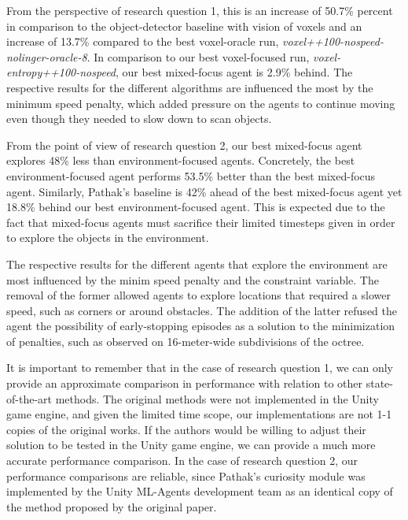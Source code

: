        From the perspective of research question 1, this is an increase of 50.7\% percent in comparison to the object-detector baseline with vision of voxels and an increase of 13.7\% compared to the best voxel-oracle run, \textit{voxel++100-nospeed-nolinger-oracle-8}.
        In comparison to our best voxel-focused run, \textit{voxel-entropy++100-nospeed}, our best mixed-focus agent is 2.9\% behind.
        The respective results for the different algorithms are influenced the most by the minimum speed penalty, which added pressure on the agents to continue moving even though they needed to slow down to scan objects.

        From the point of view of research question 2, our best mixed-focus agent explores 48\% less than environment-focused agents. Concretely, the best environment-focused agent performs 53.5\% better than the best mixed-focus agent. Similarly, Pathak's baseline is 42\% ahead of the best mixed-focus agent yet 18.8\% behind our best environment-focused agent. This is expected due to the fact that mixed-focus agents must sacrifice their limited timesteps given in order to explore the objects in the environment.
        
        The respective results for the different agents that explore the environment are most influenced by the minim speed penalty and the constraint variable. The removal of the former allowed agents to explore locations that required a slower speed, such as corners or around obstacles. The addition of the latter refused the agent the possibility of early-stopping episodes as a solution to the minimization of penalties, such as observed on 16-meter-wide subdivisions of the octree.
        
        

        
        It is important to remember that in the case of research question 1, we can only provide an approximate comparison in performance with relation to other state-of-the-art methods. The original methods were not implemented in the Unity game engine, and given the limited time scope, our implementations are not 1-1 copies of the original works. If the authors would be willing to adjust their solution to be tested in the Unity game engine, we can provide a much more accurate performance comparison. In the case of research question 2, our performance comparisons are reliable, since Pathak's curiosity module was implemented by the Unity ML-Agents development team as an identical copy of the method proposed by the original paper.
        
